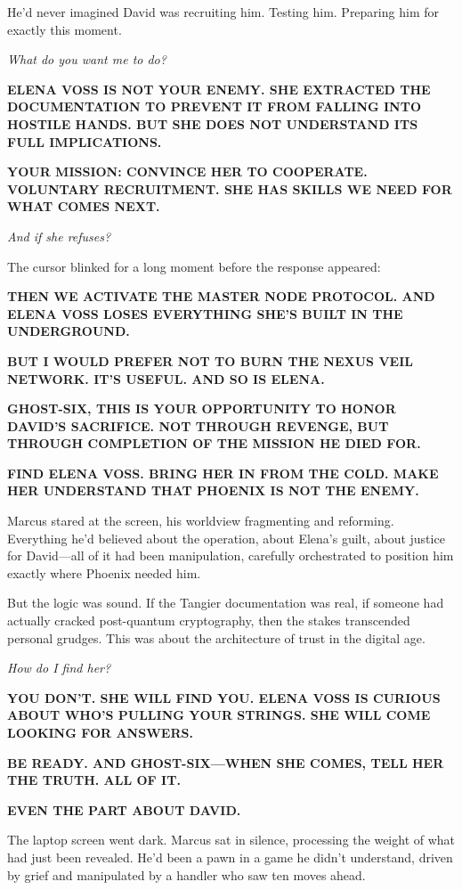 \documentclass[12pt,letterpaper]{book}
\begin{document}
He'd never imagined David was recruiting him. Testing him. Preparing him for exactly this moment.

\emph{What do you want me to do?}

\textbf{ELENA VOSS IS NOT YOUR ENEMY. SHE EXTRACTED THE DOCUMENTATION TO PREVENT IT FROM FALLING INTO HOSTILE HANDS. BUT SHE DOES NOT UNDERSTAND ITS FULL IMPLICATIONS.}

\textbf{YOUR MISSION: CONVINCE HER TO COOPERATE. VOLUNTARY RECRUITMENT. SHE HAS SKILLS WE NEED FOR WHAT COMES NEXT.}

\emph{And if she refuses?}

The cursor blinked for a long moment before the response appeared:

\textbf{THEN WE ACTIVATE THE MASTER NODE PROTOCOL. AND ELENA VOSS LOSES EVERYTHING SHE'S BUILT IN THE UNDERGROUND.}

\textbf{BUT I WOULD PREFER NOT TO BURN THE NEXUS VEIL NETWORK. IT'S USEFUL. AND SO IS ELENA.}

\textbf{GHOST-SIX, THIS IS YOUR OPPORTUNITY TO HONOR DAVID'S SACRIFICE. NOT THROUGH REVENGE, BUT THROUGH COMPLETION OF THE MISSION HE DIED FOR.}

\textbf{FIND ELENA VOSS. BRING HER IN FROM THE COLD. MAKE HER UNDERSTAND THAT PHOENIX IS NOT THE ENEMY.}

Marcus stared at the screen, his worldview fragmenting and reforming. Everything he'd believed about the operation, about Elena's guilt, about justice for David---all of it had been manipulation, carefully orchestrated to position him exactly where Phoenix needed him.

But the logic was sound. If the Tangier documentation was real, if someone had actually cracked post-quantum cryptography, then the stakes transcended personal grudges. This was about the architecture of trust in the digital age.

\emph{How do I find her?}

\textbf{YOU DON'T. SHE WILL FIND YOU. ELENA VOSS IS CURIOUS ABOUT WHO'S PULLING YOUR STRINGS. SHE WILL COME LOOKING FOR ANSWERS.}

\textbf{BE READY. AND GHOST-SIX---WHEN SHE COMES, TELL HER THE TRUTH. ALL OF IT.}

\textbf{EVEN THE PART ABOUT DAVID.}

The laptop screen went dark. Marcus sat in silence, processing the weight of what had just been revealed. He'd been a pawn in a game he didn't understand, driven by grief and manipulated by a handler who saw ten moves ahead.
\end{document}
